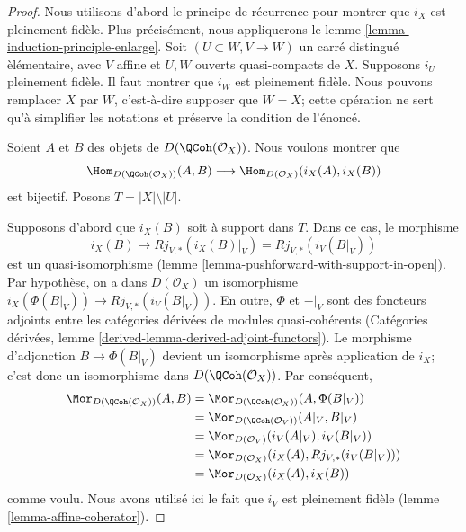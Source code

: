 \begin{proof}
Nous utilisons d'abord le principe de r\'ecurrence pour montrer que $i_X$ est
pleinement fid\`ele. Plus pr\'ecis\'ement, nous appliquerons le
lemme \ref{lemma-induction-principle-enlarge}. Soit
$(U \subset W, V \to W)$ un carr\'e distingu\'e \`el\'ementaire, avec $V$
affine et $U,W$ ouverts quasi-compacts de $X$. Supposons $i_U$ pleinement
fid\`ele. Il faut montrer que $i_W$ est pleinement fid\`ele. Nous pouvons
remplacer $X$ par $W$, c'est-\`a-dire supposer que $W = X$; cette op\'eration
ne sert qu'\`a simplifier les notations et pr\'eserve la condition de l'\'enonc\'e.

\medskip\noindent
Soient $A$ et $B$ des objets de $D(\QCoh(\mathcal{O}_X))$. Nous voulons
montrer que
$$
\Hom_{D(\QCoh(\mathcal{O}_X))}(A, B)
\longrightarrow
\Hom_{D(\mathcal{O}_X)}(i_X(A), i_X(B))
$$
est bijectif. Posons $T = |X| \setminus |U|$.

\medskip\noindent
Supposons d'abord que $i_X(B)$ soit \`a support dans $T$. Dans ce cas, le
morphisme
$$
i_X(B) \to Rj_{V, *}(i_X(B)|_V) = Rj_{V, *}(i_V(B|_V))
$$
est un quasi-isomorphisme (lemme
\ref{lemma-pushforward-with-support-in-open}). Par hypoth\`ese, on a dans
$D(\mathcal{O}_X)$ un isomorphisme
$i_X(\Phi(B|_V)) \to Rj_{V, *}(i_V(B|_V))$. En outre, $\Phi$ et ${-}|_V$
sont des foncteurs adjoints entre les cat\'egories d\'eriv\'ees de modules
quasi-coh\'erents (Cat\'egories d\'eriv\'ees, lemme
\ref{derived-lemma-derived-adjoint-functors}). Le morphisme d'adjonction
$B \to \Phi(B|_V)$ devient un isomorphisme apr\`es application de $i_X$;
c'est donc un isomorphisme dans $D(\QCoh(\mathcal{O}_X))$. Par cons\'equent,
\begin{align*}
\Mor_{D(\QCoh(\mathcal{O}_X))}(A, B)
& =
\Mor_{D(\QCoh(\mathcal{O}_X))}(A, \Phi(B|_V)) \\
& =
\Mor_{D(\QCoh(\mathcal{O}_V))}(A|_V, B|_V) \\
& =
\Mor_{D(\mathcal{O}_V)}(i_V(A|_V), i_V(B|_V)) \\
& =
\Mor_{D(\mathcal{O}_X)}(i_X(A), Rj_{V, *}(i_V(B|_V))) \\
& =
\Mor_{D(\mathcal{O}_X)}(i_X(A), i_X(B))
\end{align*}
comme voulu. Nous avons utilis\'e ici le fait que $i_V$ est pleinement fid\`ele
(lemme \ref{lemma-affine-coherator}).


\end{proof}
